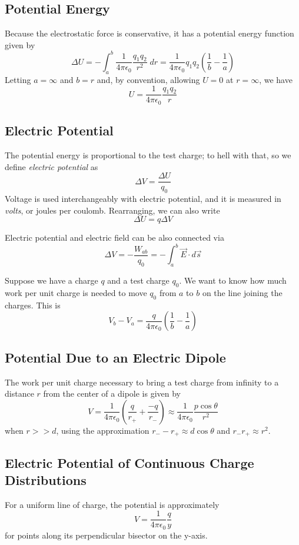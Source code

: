 \documentclass[../PhysicsFormulae.tex]{subfiles}
\begin{document}
\subsection{Potential Energy}
Because the electrostatic force is conservative, it has a potential energy function given by 
\[ \Delta U = -\int_a^b \frac{1}{4\pi\epsilon_0} \frac{q_1q_2}{r^2} \; dr = \frac{1}{4\pi \epsilon_0}q_1q_2 \left(\frac{1}{b} - \frac{1}{a} \right) \]
Letting $a = \infty$ and $b = r$ and, by convention, allowing $U=0$ at $r = \infty$, we have 
\[ U = \frac{1}{4\pi\epsilon_0}\frac{q_1q_2}{r} \]

\subsection{Electric Potential}
The potential energy is proportional to the test charge; to hell with that, so we define \textit{electric potential} as
\[ \Delta V = \frac{\Delta U}{q_0} \]
Voltage is used interchangeably with electric potential, and it is measured in \textit{volts}, or joules per coulomb. Rearranging, we can also write 
\[ \Delta U = q \Delta V \]

Electric potential and electric field can be also connected via
\[ \Delta V = -\frac{W_{ab}}{q_0} = -\int_a^b \vec{E} \cdot d\vec{s} \]

Suppose we have a charge $q$ and a test charge $q_0$. We want to know how much work per unit charge is needed to move $q_0$ from $a$ to $b$ on the line joining the charges. This is
\[ V_b - V_a = \frac{q}{4\pi \epsilon_0} \left(\frac{1}{b} - \frac{1}{a} \right) \]

\subsection{Potential Due to an Electric Dipole}
The work per unit charge necessary to bring a test charge from infinity to a distance $r$ from the center of a dipole is given by 
\[ V = \frac{1}{4\pi \epsilon_0} \left(\frac{q}{r_+} + \frac{-q}{r_-} \right) \approx \frac{1}{4\pi \epsilon_0} \frac{p\cos{\theta}}{r^2} \]
when $r>>d$, using the approximation $r_- - r_+ \approx d\cos{\theta}$ and $r_-r_+ \approx r^2$. 

\subsection{Electric Potential of Continuous Charge Distributions}
For a uniform line of charge, the potential is approximately
\[ V = \frac{1}{4\pi \epsilon_0} \frac{q}{y} \]
for points along its perpendicular bisector on the y-axis. \bigskip
\end{document}
